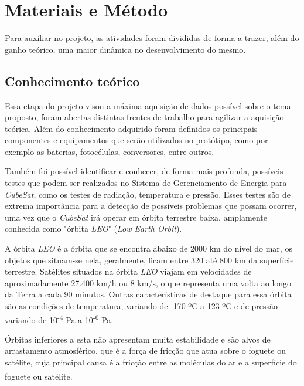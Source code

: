 \documentclass[
	12pt,				%
	openright,			%
	oneside,			%
	a4paper,			%
	english,			%
	french,				%
	spanish,			%
	brazil,				%
	oldfontcommands
	]{abntex2}
\begin{document}
\chapter[Materiais e Método]{Materiais e Método}

	Para auxiliar no projeto, as atividades foram divididas de forma a trazer, além do ganho teórico, uma maior dinâmica no desenvolvimento do mesmo.

\section[Conhecimento teórico]{Conhecimento teórico}

	Essa etapa do projeto visou a máxima aquisição de dados possível sobre o tema proposto, foram abertas distintas frentes de trabalho para agilizar a aquisição teórica. Além do conhecimento adquirido foram definidos os principais componentes e equipamentos que serão utilizados no protótipo, como por exemplo as baterias, fotocélulas, conversores, entre outros.
	
	Também foi possível identificar e conhecer, de forma mais profunda, possíveis testes que podem ser realizados no Sistema de Gerenciamento de Energia para \textit{CubeSat}, como os testes de radiação, temperatura e pressão. Esses testes são de extrema importância para a detecção de possíveis problemas que possam ocorrer, uma vez que o  \textit{CubeSat} irá operar em órbita terrestre baixa, amplamente conhecida como "órbita \textit{LEO}" (\textit{Low Earth Orbit}).
	
	A órbita \textit{LEO} é a órbita que se encontra abaixo de 2000 km do nível do mar, os objetos que situam-se nela, geralmente, ficam entre 320 até 800 km da superfície terrestre. Satélites situados na órbita \textit{LEO} viajam em velocidades de aproximadamente 27.400 km/h ou 8 km/s, o que representa uma volta ao longo da Terra a cada 90 minutos. Outras características de destaque para essa órbita são as condições de temperatura, variando de -170 ºC a 123 ºC e de pressão variando de 10\textsuperscript{-4} Pa a 10\textsuperscript{-6} Pa.\textsuperscript{\cite{LEO}}
	
	Órbitas inferiores a esta não apresentam muita estabilidade e são alvos de arrastamento atmosférico, que é a força de fricção que atua sobre o foguete ou satélite, cuja principal causa é a fricção entre as moléculas do ar e a superfície do foguete ou satélite.\textsuperscript{\cite{NASA2}}
	
\end{document}
